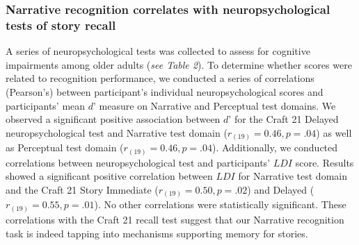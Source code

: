 \documentclass[11pt]{article}
\begin{document}
\subsubsection*{Narrative recognition correlates with neuropsychological tests of story recall}
A series of neuropsychological tests was collected to assess for cognitive impairments among older adults (\textit{see Table 2}). To determine whether scores were related to recognition performance, we conducted a series of correlations (Pearson's) between participant’s individual neuropsychological scores and participants’ mean $d’$ measure on Narrative and Perceptual test domains. We observed a significant positive association between $d’$ for the Craft 21 Delayed neuropsychological test and Narrative test domain ($r_{(19)} = 0.46, p = .04$) as well as Perceptual test domain ($r_{(19)} = 0.46, p = .04$). Additionally, we conducted correlations between neuropsychological test and participants’ $LDI$ score. Results showed a significant positive correlation between $LDI$ for Narrative test domain and the Craft 21 Story Immediate ($r_{(19)} = 0.50, p = .02$) and Delayed ($r_{(19)} = 0.55, p = .01$). No other correlations were statistically significant. These correlations with the Craft 21 recall test suggest that our Narrative recognition task is indeed tapping into mechanisms supporting memory for stories.
\end{document}
